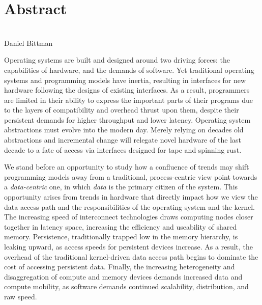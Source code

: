 \begingroup
\let\clearpage\relax
\let\cleardoublepage\relax
\let\cleardoublepage\relax

\chapter*{Abstract}

\begin{center}
    \Large {}\\
    \normalsize
    Daniel Bittman
\end{center}
\medskip

Operating systems are built and designed around two driving forces: the capabilities of hardware, and the demands of
software. Yet traditional operating systems and programming models have inertia, resulting
in interfaces for new hardware following the designs of existing interfaces. As a result, programmers are limited in their ability to express
the important parts of their programs due to the layers of compatibility and overhead thrust upon them, despite their
persistent demands for higher throughput and lower latency. Operating system abstractions must evolve into the modern day.
Merely relying on decades old abstractions and incremental change will
relegate novel hardware of the last decade to a fate of access via interfaces designed for tape and spinning rust.

We stand before an opportunity to study how a confluence of trends may shift programming models away from a
traditional, process-centric view point towards a \emph{data-centric} one, in which \emph{data} is the primary citizen
of the system.
This opportunity arises from trends in hardware that directly impact how we view the data access path and the
responsibilities of the operating system and the kernel.
The increasing speed of interconnect technologies draws computing nodes closer together in latency space,
increasing the efficiency and useability of shared memory. Persistence, traditionally trapped low in the memory
hierarchy, is leaking upward, as access speeds for persistent devices increase. As a result,
the overhead of the traditional kernel-driven data access path begins to dominate the cost of accessing persistent data.
Finally, the increasing heterogeneity and disaggregation of compute and memory devices demands increased data and
compute mobility, as software demands continued scalability, distribution, and raw speed.


